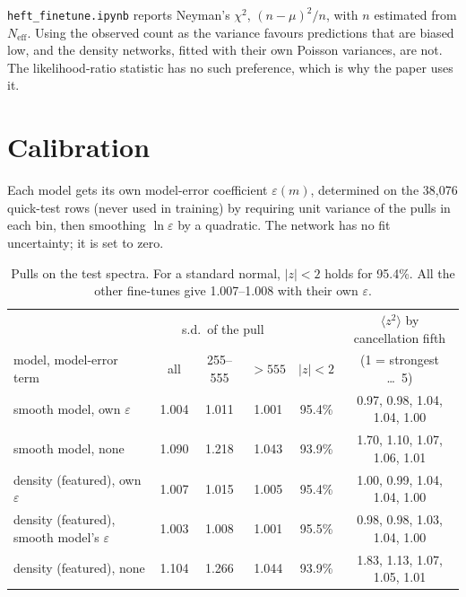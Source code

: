\documentclass[11pt]{article}
\newcommand{\file}[1]{\nolinkurl{#1}}
\begin{document}
\begin{aside}
\file{heft_finetune.ipynb} reports Neyman's $\chi^2$, $(n-\mu)^2/n$, with $n$ estimated from $N_\text{eff}$. Using
the observed count as the variance favours predictions that are biased low, and the density networks,
fitted with their own Poisson variances, are not. The likelihood-ratio statistic has no such preference,
which is why the paper uses it.
\end{aside}

\section{Calibration}

Each model gets its own model-error coefficient $\varepsilon(m)$, determined on the 38,076 quick-test rows (never
used in training) by requiring unit variance of the pulls in each bin, then smoothing $\ln\varepsilon$ by a
quadratic. The network has no fit uncertainty; it is set to zero.

\begin{table}[h]
\centering
\small
\setlength{\tabcolsep}{4pt}
\begin{tabular}{lccccc}
\toprule
 & \multicolumn{3}{c}{s.d.\ of the pull} & & $\langle z^2\rangle$ by cancellation fifth\\
model, model-error term & all & 255--555 & $>555$ & $|z|<2$ & (1 = strongest \dots\ 5)\\
\midrule
smooth model, own $\varepsilon$ & 1.004 & 1.011 & 1.001 & 95.4\% & 0.97, 0.98, 1.04, 1.04, 1.00\\
smooth model, none & 1.090 & 1.218 & 1.043 & 93.9\% & 1.70, 1.10, 1.07, 1.06, 1.01\\
\midrule
density (featured), own $\varepsilon$ & 1.007 & 1.015 & 1.005 & 95.4\% & 1.00, 0.99, 1.04, 1.04, 1.00\\
density (featured), smooth model's $\varepsilon$ & 1.003 & 1.008 & 1.001 & 95.5\% & 0.98, 0.98, 1.03, 1.04, 1.00\\
density (featured), none & 1.104 & 1.266 & 1.044 & 93.9\% & 1.83, 1.13, 1.07, 1.05, 1.01\\
\bottomrule
\end{tabular}
\caption{Pulls on the test spectra. For a standard normal, $|z|<2$ holds for 95.4\%. All the other fine-tunes
give 1.007--1.008 with their own $\varepsilon$.}
\label{tab:cal}
\end{table}
\end{document}
